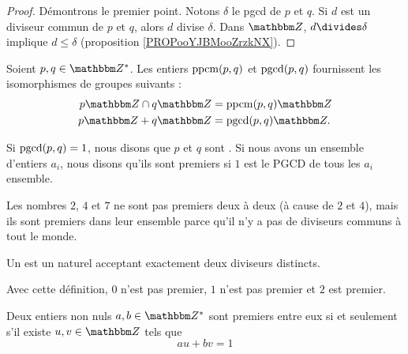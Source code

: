 \begin{proof}
    Démontrons le premier point. Notons \( \delta\) le pgcd de \( p\) et \( q\). Si \( d\) est un diviseur commun de \( p\) et \( q\), alors \( d\) divise \( \delta\). Dans \( \eZ\), \( d\divides \delta\) implique \( d\leq\delta\) (proposition \ref{PROPooYJBMooZrzkNX}).
\end{proof}

\begin{lemma}
    Soient \( p,q\in\eZ^*\). Les entiers \( \operatorname{ppcm}(p,q)\) et \( \operatorname{pgcd}(p,q)\) fournissent les isomorphismes de groupes suivants :
\begin{subequations}
    \begin{align}
        p\eZ\cap q\eZ&=\ppcm(p,q)\eZ\\
        p\eZ + q\eZ&=\pgcd(p,q)\eZ.
    \end{align}
\end{subequations}
\end{lemma}

\begin{definition}  \label{DefZHRXooNeWIcB}
    Si \( \operatorname{pgcd}(p,q)=1\), nous disons que \( p\) et \( q\) sont . Si nous avons un ensemble d'entiers \( a_i\), nous disons qu'ils sont premiers  si \( 1\) est le PGCD de tous les \( a_i\) ensemble.
\end{definition}

Les nombres \( 2\), \( 4\) et \( 7\) ne sont pas premiers deux à deux (à cause de \( 2\) et \( 4\)), mais ils sont premiers dans leur ensemble parce qu'il n'y a pas de diviseurs communs à tout le monde.

\begin{definition}
    Un  est un naturel acceptant exactement deux diviseurs distincts.
\end{definition}
Avec cette définition, \( 0\) n'est pas premier, \( 1\) n'est pas premier et \( 2\) est premier.

\begin{theorem} \label{ThoBuNjam}
    Deux entiers non nuls \( a,b\in\eZ^*\) sont premiers entre eux si et seulement s'il existe \( u,v\in\eZ\) tels que
    \begin{equation}
        au+bv=1
    \end{equation}
\end{theorem}

